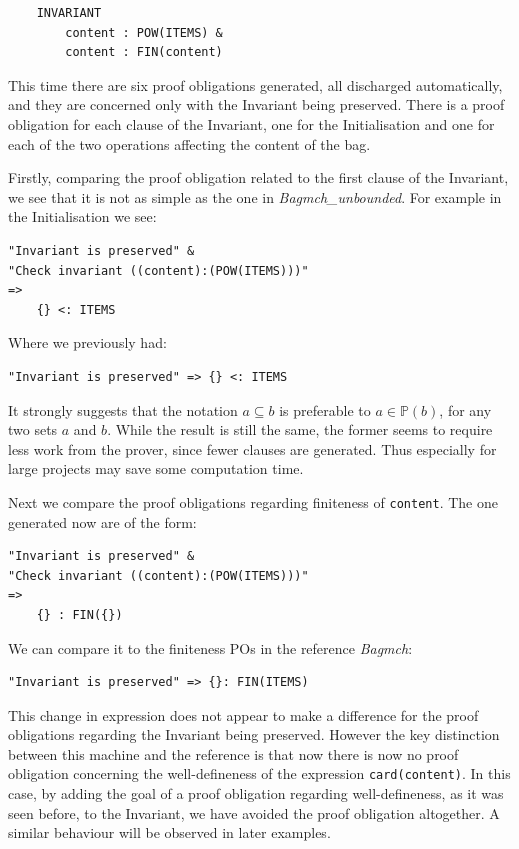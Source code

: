 \documentclass[11pt,journal]{IEEEtran}
\begin{document}
	\begin{lstlisting}
	INVARIANT
	    content : POW(ITEMS) & 
		content : FIN(content) 
	\end{lstlisting}
	
	This time there are six proof obligations generated, all discharged automatically, and they are concerned only with the Invariant being preserved. There is a proof obligation for each clause of the Invariant, one for the Initialisation and one for each of the two operations affecting the content of the bag. 
	
	Firstly, comparing the proof obligation related to the first clause of the Invariant, we see that it is not as simple as the one in \emph{Bagmch\_unbounded}. For example in the Initialisation we see:
	
	\begin{lstlisting}
"Invariant is preserved" &
"Check invariant ((content):(POW(ITEMS)))" 
=>
	{} <: ITEMS 
	\end{lstlisting}

	Where we previously had:
	\begin{lstlisting}
"Invariant is preserved" => {} <: ITEMS 
	\end{lstlisting}
	
	It strongly suggests that the notation $a \subseteq b$ is preferable to $a \in \mathbb{P}(b)$, for any two sets $a$ and $b$. While the result is still the same, the former seems to require less work from the prover, since fewer clauses are generated. Thus especially for large projects may save some computation time. 
	
	Next we compare the proof obligations regarding finiteness of \texttt{content}. The one generated now are of the form:
	
	\begin{lstlisting}
"Invariant is preserved" &
"Check invariant ((content):(POW(ITEMS)))" 
=>
	{} : FIN({}) 
	\end{lstlisting}
	
	We can compare it to the finiteness POs in the reference \emph{Bagmch}:
	
	\begin{lstlisting}
"Invariant is preserved" => {}: FIN(ITEMS)  
	\end{lstlisting}
	
	This change in expression does not appear to make a difference for the proof obligations regarding the Invariant being preserved. However the key distinction between this machine and the reference is that now there is now no proof obligation concerning the well-defineness of the expression \texttt{card(content)}. In this case, by adding the goal of a proof obligation regarding well-defineness, as it was seen before, to the Invariant, we have avoided the proof obligation altogether. A similar behaviour will be observed in later examples.
	
\end{document}
